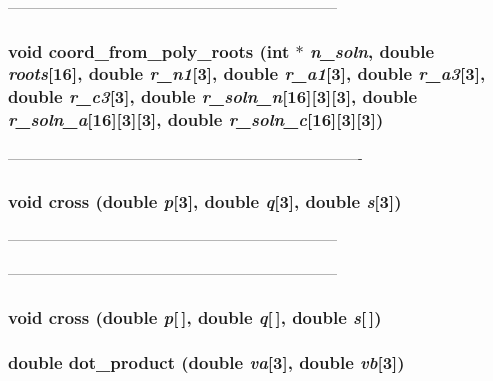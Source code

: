 ----------------------------------------------------------------------- 

\subsubsection{\setlength{\rightskip}{0pt plus 5cm}void coord\_\-from\_\-poly\_\-roots (int $\ast$ {\em n\_\-soln}, double {\em roots}[16], double {\em r\_\-n1}[3], double {\em r\_\-a1}[3], double {\em r\_\-a3}[3], double {\em r\_\-c3}[3], double {\em r\_\-soln\_\-n}[16][3][3], double {\em r\_\-soln\_\-a}[16][3][3], double {\em r\_\-soln\_\-c}[16][3][3])}\label{PTripepClosure_8h_f44b3a456561aff184243204d214e0ea}


---------------------------------------------------------------------------- 

\subsubsection{\setlength{\rightskip}{0pt plus 5cm}void cross (double {\em p}[3], double {\em q}[3], double {\em s}[3])}\label{PTripepClosure_8h_bd012c0000f231f59e7fd5206823799c}


----------------------------------------------------------------------- 



----------------------------------------------------------------------- 
\subsubsection{\setlength{\rightskip}{0pt plus 5cm}void cross (double {\em p}[$\,$], double {\em q}[$\,$], double {\em s}[$\,$])}\label{PTripepClosure_8h_a8f1e1511ade1c21f0a01d0be1d095aa}


\subsubsection{\setlength{\rightskip}{0pt plus 5cm}double dot\_\-product (double {\em va}[3], double {\em vb}[3])}\label{PTripepClosure_8h_3566359dbdc5bef325337831425b75d5}


